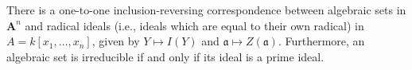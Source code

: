 There is a one-to-one inclusion-reversing correspondence between algebraic sets in $\mathbf{A}^n$ and radical ideals (i.e., ideals which are equal to their own radical) in $A = k[x_1,\ldots,x_n]$, given by $Y \mapsto I(Y)$ and $\mathfrak{a} \mapsto Z(\mathfrak{a})$. Furthermore, an algebraic set is irreducible if and only if its ideal is a prime ideal.
